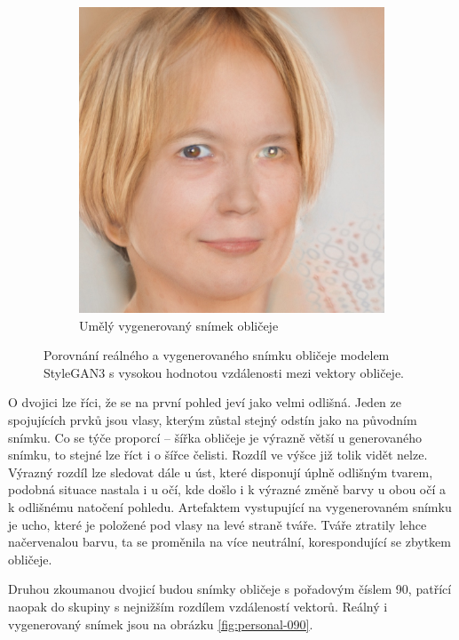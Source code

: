 \begin{figure}[H]
\begin{subfigure}{0.45\textwidth}
         \includegraphics[width=1\textwidth]{obrazky-figures/gen-242.jpeg}
         \caption{Umělý vygenerovaný snímek obličeje}
         \label{fig:personal-242-gen}
     \end{subfigure}
    \caption{Porovnání reálného a vygenerovaného snímku obličeje modelem StyleGAN3 s vysokou hodnotou vzdálenosti mezi vektory obličeje.}
    \label{fig:personal-242}
\end{figure}

O dvojici lze říci, že se na první pohled jeví jako velmi odlišná. Jeden ze spojujících prvků jsou vlasy, kterým zůstal stejný odstín jako na původním snímku. Co se týče proporcí -- šířka obličeje je výrazně větší u generovaného snímku, to stejné lze říct i o šířce čelisti. Rozdíl ve výšce již tolik vidět nelze. Výrazný rozdíl lze sledovat dále u úst, které disponují úplně odlišným tvarem, podobná situace nastala i u očí, kde došlo i k výrazné změně barvy u obou očí a k odlišnému natočení pohledu. Artefaktem vystupující na vygenerovaném snímku je ucho, které je položené pod vlasy na levé straně tváře. Tváře ztratily lehce načervenalou barvu, ta se proměnila na více neutrální, korespondující se zbytkem obličeje.

\bigskip

\noindent Druhou zkoumanou dvojicí budou snímky obličeje s pořadovým číslem 90, patřící naopak do skupiny s nejnižším rozdílem vzdáleností vektorů. Reálný i vygenerovaný snímek jsou na obrázku \ref{fig:personal-090}.

